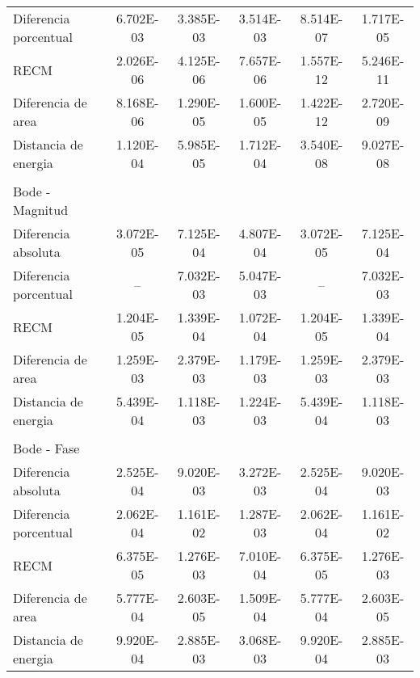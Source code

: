 {\begin{longtable}{l @{\extracolsep{\fill}} ccccc}
            Diferencia porcentual  & \num{6.702E-03} & \num{3.385E-03} & \num{3.514E-03} & \num{8.514E-07} & \num{1.717E-05}  \\
            RECM                   & \num{2.026E-06} & \num{4.125E-06} & \num{7.657E-06} & \num{1.557E-12} & \num{5.246E-11}  \\
            Diferencia de area     & \num{8.168E-06} & \num{1.290E-05} & \num{1.600E-05} & \num{1.422E-12} & \num{2.720E-09}  \\
            Distancia de energia   & \num{1.120E-04} & \num{5.985E-05} & \num{1.712E-04} & \num{3.540E-08} & \num{9.027E-08}  \\
            & & & & & \\
            Bode - Magnitud        &  &  &  &  & \\ \cmidrule{1-1}
            Diferencia absoluta    & \num{3.072E-05} & \num{7.125E-04} & \num{4.807E-04} & \num{3.072E-05} & \num{7.125E-04}  \\
            Diferencia porcentual  &        --       & \num{7.032E-03} & \num{5.047E-03} &        --       & \num{7.032E-03}  \\
            RECM                   & \num{1.204E-05} & \num{1.339E-04} & \num{1.072E-04} & \num{1.204E-05} & \num{1.339E-04}  \\
            Diferencia de area     & \num{1.259E-03} & \num{2.379E-03} & \num{1.179E-03} & \num{1.259E-03} & \num{2.379E-03}  \\
            Distancia de energia   & \num{5.439E-04} & \num{1.118E-03} & \num{1.224E-03} & \num{5.439E-04} & \num{1.118E-03}  \\
            & & & & & \\
            Bode - Fase            &  &  &  &  & \\ \cmidrule{1-1}
            Diferencia absoluta    & \num{2.525E-04} & \num{9.020E-03} & \num{3.272E-03} & \num{2.525E-04} & \num{9.020E-03}  \\
            Diferencia porcentual  & \num{2.062E-04} & \num{1.161E-02} & \num{1.287E-03} & \num{2.062E-04} & \num{1.161E-02}  \\
            RECM                   & \num{6.375E-05} & \num{1.276E-03} & \num{7.010E-04} & \num{6.375E-05} & \num{1.276E-03}  \\
            Diferencia de area     & \num{5.777E-04} & \num{2.603E-05} & \num{1.509E-04} & \num{5.777E-04} & \num{2.603E-05}  \\
            Distancia de energia   & \num{9.920E-04} & \num{2.885E-03} & \num{3.068E-03} & \num{9.920E-04} & \num{2.885E-03}  \\

\end{longtable}}
